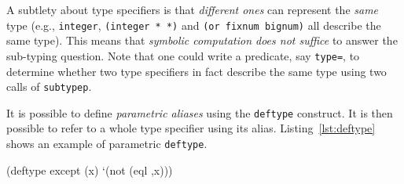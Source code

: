 \documentclass[format=sigconf]{acmart}
\newcommand\code[2][\small]{\sloppy\texttt{#1#2}}
\theoremstyle{definition}
\begin{document}
A subtlety about type specifiers is that \emph{different ones} can
represent the \textit{same} type (e.g., \code{integer}, \code{(integer * *)} and
\code{(or fixnum bignum)} all describe the same type). This means that
\emph{symbolic computation does not suffice} to answer the sub-typing question.
Note that one could write a predicate, say \code{type=}, to determine whether
two type specifiers in fact describe the same type using two calls of
\code{subtypep}.

It is possible to define \emph{parametric aliases} using the \code{deftype}
construct. It is then possible to refer to a whole type specifier using its
alias. Listing~\ref{lst:deftype} shows an example of parametric
\code{deftype}.

\begin{listing}
\begin{clcode}
(deftype except (x)
  `(not (eql ,x)))
\end{clcode}
\caption{The \code{deftype} construct}
\label{lst:deftype}
\end{listing}
\end{document}
